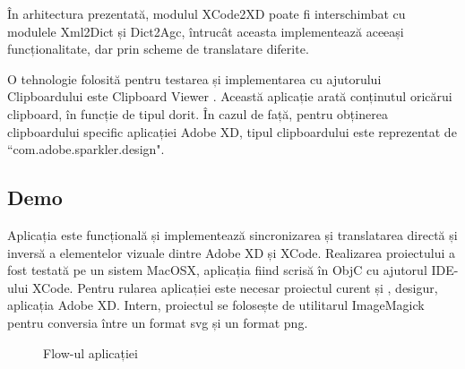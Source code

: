 În arhitectura prezentată, modulul XCode2XD poate fi interschimbat cu modulele Xml2Dict și Dict2Agc, întrucât aceasta implementează aceeași funcționalitate, dar prin scheme de translatare diferite.


O tehnologie folosită pentru testarea și implementarea cu ajutorului Clipboardului este Clipboard Viewer \cite{clipboard}. Această aplicație arată conținutul oricărui clipboard, în funcție de tipul dorit. În cazul de față, pentru obținerea clipboardului specific aplicației Adobe XD, tipul clipboardului este reprezentat de ``com.adobe.sparkler.design".

\subsection{Demo}
Aplicația este funcțională și implementează sincronizarea și translatarea directă și inversă a elementelor vizuale dintre Adobe XD și XCode. 
Realizarea proiectului a fost testată pe un sistem MacOSX, aplicația fiind scrisă în ObjC cu ajutorul IDE-ului XCode. Pentru rularea aplicației este necesar proiectul curent \cite{repoGit} și , desigur, aplicația Adobe XD.
Intern, proiectul se folosește de utilitarul ImageMagick pentru conversia între un format svg și un format png.

\begin{figure}[!htbp]
\centering
{}
\caption{Flow-ul aplicației} \label{fig:Prezentare}
\end{figure}

